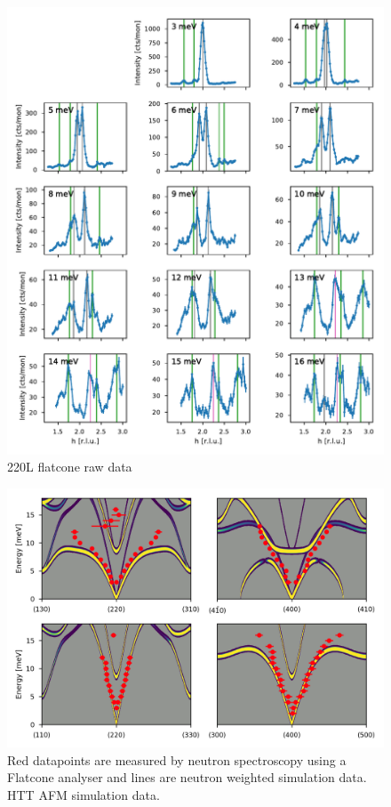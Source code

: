 \begin{figure}
    \centering
    \includegraphics[width=\textwidth]{fig/lowen/fits_220L.pdf}
    \caption[220L flatcone raw data]{220L flatcone raw data}
\end{figure}

\begin{figure}[]
    \centering
    \includegraphics[width=\textwidth]{fig/lowen/flatcone_fits_simulation_htt_afm.png}
    \caption[Flatcone dispersion and neutron weighted simulation data]{Red datapoints are measured  by neutron spectroscopy using a Flatcone analyser  and lines are neutron weighted simulation data. HTT AFM simulation data.}
\end{figure}

